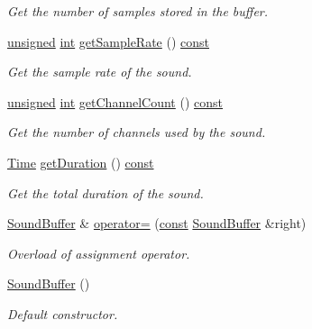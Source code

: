 \begin{DoxyCompactItemize}
\begin{DoxyCompactList}\small\item\em Get the number of samples stored in the buffer. \end{DoxyCompactList}\item 
\hyperlink{curses_8priv_8h_aca40206900cfc164654362fa8d4ad1e6}{unsigned} \hyperlink{term__entry_8h_ad65b480f8c8270356b45a9890f6499ae}{int} \hyperlink{classsf_1_1_sound_buffer_a8cdfaea2ad1d05f81fa67442566c166e}{get\-Sample\-Rate} () \hyperlink{term__entry_8h_a57bd63ce7f9a353488880e3de6692d5a}{const} 
\begin{DoxyCompactList}\small\item\em Get the sample rate of the sound. \end{DoxyCompactList}\item 
\hyperlink{curses_8priv_8h_aca40206900cfc164654362fa8d4ad1e6}{unsigned} \hyperlink{term__entry_8h_ad65b480f8c8270356b45a9890f6499ae}{int} \hyperlink{classsf_1_1_sound_buffer_a0a2890747db3811fb8d969d3e3abd0d1}{get\-Channel\-Count} () \hyperlink{term__entry_8h_a57bd63ce7f9a353488880e3de6692d5a}{const} 
\begin{DoxyCompactList}\small\item\em Get the number of channels used by the sound. \end{DoxyCompactList}\item 
\hyperlink{classsf_1_1_time}{Time} \hyperlink{classsf_1_1_sound_buffer_aee681c7a0f3dff4c4d0c9f8bbdb51bb0}{get\-Duration} () \hyperlink{term__entry_8h_a57bd63ce7f9a353488880e3de6692d5a}{const} 
\begin{DoxyCompactList}\small\item\em Get the total duration of the sound. \end{DoxyCompactList}\item 
\hyperlink{classsf_1_1_sound_buffer}{Sound\-Buffer} \& \hyperlink{classsf_1_1_sound_buffer_adcc786b60bbd95be1551368fafd274a7}{operator=} (\hyperlink{term__entry_8h_a57bd63ce7f9a353488880e3de6692d5a}{const} \hyperlink{classsf_1_1_sound_buffer}{Sound\-Buffer} \&right)
\begin{DoxyCompactList}\small\item\em Overload of assignment operator. \end{DoxyCompactList}\item 
\hyperlink{classsf_1_1_sound_buffer_a0cabfbfe19b831bf7d5c9592d92ef233}{Sound\-Buffer} ()
\begin{DoxyCompactList}\small\item\em Default constructor. \end{DoxyCompactList}\item 

\end{DoxyCompactItemize}
